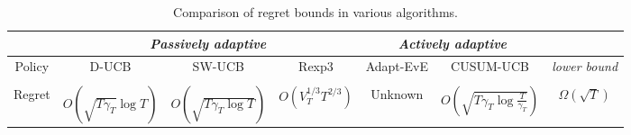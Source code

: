 \documentclass[letterpaper]{article} %
\begin{document}
\begin{table}[t]
  \small
  \centering
  \caption{
  Comparison of regret bounds in various algorithms.
  }
  \label{table:regret}
  \tabcolsep 1pt
\begin{center}
    \begin{tabular}{|c|c|c|c|c|c|c|}
    \hline
    & \multicolumn{3}{c|}{\em Passively adaptive} &
                                                   \multicolumn{2}{c|}{\em
                                                   Actively adaptive}
      & \\
    \hline
    \multirow{2}{*}{Policy} & D-UCB & SW-UCB & Rexp3
    & Adapt-EvE  & CUSUM-UCB & {\em lower bound}\\
    &  {\scriptsize\cite{kocsis2006discounted}}& {\scriptsize\cite{garivier2008upper}}& {\scriptsize\cite{besbes2014stochastic}} & {\scriptsize\cite{hartland2007change}}  & & {\scriptsize \cite{garivier2008upper}}\\
    \hline
    Regret & $O(\sqrt{T\gamma_T}\log T)$ & $O(\sqrt{T\gamma_T\log T})$ & $O(V_T^{1/3}T^{2/3})$
    & Unknown & $O(\sqrt{T\gamma_T\log{\frac{T}{\gamma_T}}})$ & $\Omega(\sqrt{T})$\\
    \hline
  \end{tabular}
\end{center}
  \label{tbl:regret_comparison}
\vspace{-0.0cm}
\end{table}
\end{document}
